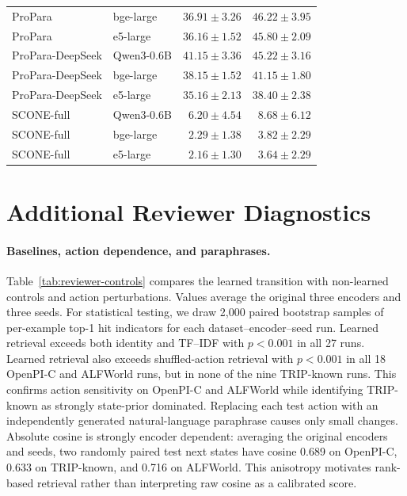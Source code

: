 \documentclass{article}
\begin{document}
\begin{table}[h]
\begin{tabular}{llrr}
    ProPara & bge-large & $36.91{\pm}3.26$ & $46.22{\pm}3.95$ \\
    ProPara & e5-large & $36.16{\pm}1.52$ & $45.80{\pm}2.09$ \\
    \midrule
    ProPara-DeepSeek & Qwen3-0.6B & $41.15{\pm}3.36$ & $45.22{\pm}3.16$ \\
    ProPara-DeepSeek & bge-large & $38.15{\pm}1.52$ & $41.15{\pm}1.80$ \\
    ProPara-DeepSeek & e5-large & $35.16{\pm}2.13$ & $38.40{\pm}2.38$ \\
    \midrule
    SCONE-full & Qwen3-0.6B & $6.20{\pm}4.54$ & $8.68{\pm}6.12$ \\
    SCONE-full & bge-large & $2.29{\pm}1.38$ & $3.82{\pm}2.29$ \\
    SCONE-full & e5-large & $2.16{\pm}1.30$ & $3.64{\pm}2.29$ \\
    \bottomrule
  \end{tabular}
\end{table}

\section{Additional Reviewer Diagnostics}
\label{app:additional-diagnostics}

\paragraph{Baselines, action dependence, and paraphrases.}
Table~\ref{tab:reviewer-controls} compares the learned transition with non-learned controls and action perturbations. Values average the original three encoders and three seeds. For statistical testing, we draw 2,000 paired bootstrap samples of per-example top-1 hit indicators for each dataset--encoder--seed run. Learned retrieval exceeds both identity and TF--IDF with $p<0.001$ in all 27 runs. Learned retrieval also exceeds shuffled-action retrieval with $p<0.001$ in all 18 OpenPI-C and ALFWorld runs, but in none of the nine TRIP-known runs. This confirms action sensitivity on OpenPI-C and ALFWorld while identifying TRIP-known as strongly state-prior dominated. Replacing each test action with an independently generated natural-language paraphrase causes only small changes. Absolute cosine is strongly encoder dependent: averaging the original encoders and seeds, two randomly paired test next states have cosine 0.689 on OpenPI-C, 0.633 on TRIP-known, and 0.716 on ALFWorld. This anisotropy motivates rank-based retrieval rather than interpreting raw cosine as a calibrated score.
\end{document}

